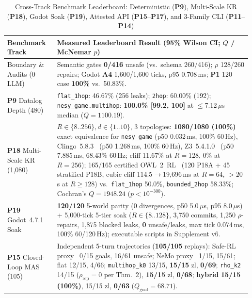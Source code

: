 \begin{table}[!tbp]
\caption{Cross-Track Benchmark Leaderboard: Deterministic (\textbf{P9}), Multi-Scale KR (\textbf{P18}), Godot Soak (\textbf{P19}), Attested API (\textbf{P15}--\textbf{P17}), and 3-Family CLI (\textbf{P11}--\textbf{P14})}
\label{tab:phase4-compact}
\centering
\scriptsize
\setlength{\tabcolsep}{2.5pt}
\begin{tabularx}{\columnwidth}{@{}>{\raggedright\arraybackslash}p{}>{\raggedright\arraybackslash}X@{}}
\toprule
\textbf{Benchmark Track} & \textbf{Measured Leaderboard Result (95\% Wilson CI; $Q$ / McNemar $p$)} \\
\midrule
Boundary \& Audits (0-LLM) & Semantic gates \textbf{0/416} unsafe (vs.\ schema 260/416); $\rho$ 128/260 repairs; Godot \textbf{A4} 1,600/1,600 ticks, p95 0.708\,ms; \textbf{P1} 120-case \textbf{100\%} vs.\ 50.83\%. \\
\textbf{P9} Datalog Depth (480) & \texttt{flat\_1hop}: 46.67\% (256 leaks); \texttt{2hop}: 60.00\% (192); \texttt{nesy\_game.multihop}: \textbf{100.0\% [99.2, 100]} at $\le$7.12\,$\mu$s median ($Q{=}1100.19$). \\
\textbf{P18} Multi-Scale KR (1,080) & $R{\in}\{8..256\}, d{\in}\{1..10\}$, 3 topologies: \textbf{1080/1080 (100\%)} exact equivalence for \texttt{nesy\_game} (p50 0.032\,ms, 100\% 60\,Hz), Clingo~5.8.3~\cite{gebser2019clingo} (p50 1.268\,ms, 100\% 60\,Hz), Z3~5.4.1.0~\cite{demoura2008z3} (p50 7.885\,ms, 68.43\% 60\,Hz; cliff 11.67\% at $R{=}128$, 0\% at $R{=}256$); 165/165 certified OWL~2~RL~\cite{motik2012owl2profiles} (120 P18A + 45 stratified P18B, cubic cliff 114.5$\to$19,696\,ms at $R{=}64$, $>20$\,s at $R{\ge}128$) vs.\ \texttt{flat\_1hop} 50.0\%, \texttt{bounded\_2hop} 58.33\%; Cochran's $Q{=}1948.24$ ($p < 10^{-300}$). \\
\textbf{P19} Godot~4.7.1 Soak & \textbf{120/120} 5-world parity (0 divergences, p50 5.0\,$\mu$s, p95 8.0\,$\mu$s) + 5,000-tick 5-tier soak ($R{\in}\{8..128\}$, 3,750 commits, 1,250 $\rho$-repairs, 1,875 blocked leaks, \textbf{0} unsafe/leaks, max tick 0.074\,ms, 100\% 60/120\,Hz); executable scripts in Supplement v6. \\
\textbf{P15} Closed-Loop MAS (105) & Independent 5-turn trajectories (\textbf{105/105} replays): Safe-RL proxy~\cite{alshiekh2018shield} 0/15 goals, 16/61 unsafe; NeMo proxy~\cite{rebedea2023nemo} 1/15, 15/61; flat 12/15, 4/66; \texttt{multihop\_k0} 13/15, \textbf{15/15} zl, \textbf{0/69}; \texttt{rho\_k2} 14/15 ($\rho_{\mathrm{rep}}{=}0$ per Thm.~2), \textbf{15/15} zl, \textbf{0/68}; \textbf{hybrid} \textbf{15/15 (100\%)}, 15/15 zl, \textbf{0/63} ($Q_{\mathrm{goal}}{=}68.71$). \\

\end{tabularx}
\end{table}
